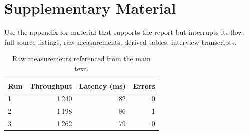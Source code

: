 \section{Supplementary Material}
\label{app:supplementary}

Use the appendix for material that supports the report but interrupts its flow:
full source listings, raw measurements, derived tables, interview transcripts.

\begin{table}[H]
    \centering
    \caption{Raw measurements referenced from the main text.}
    \label{tab:raw}
    \begin{tabular}{lrrr}
        \toprule
        \textbf{Run} & \textbf{Throughput} & \textbf{Latency (ms)} & \textbf{Errors} \\
        \midrule
        1            & 1\,240              & 82                    & 0               \\
        2            & 1\,198              & 86                    & 1               \\
        3            & 1\,262              & 79                    & 0               \\
        \bottomrule
    \end{tabular}
\end{table}

